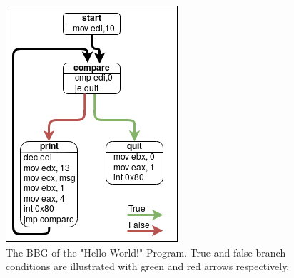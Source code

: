 \documentclass{kththesis}
\begin{document}
\begin{figure}[th]
    \centering
    \includegraphics[scale=0.6]{Images/BBGExample.png}
    \caption[The BBG of the "Hello World!" Program.]{The BBG of the "Hello World!" Program. True and false branch conditions are illustrated with green and red arrows respectively.}
    \label{fig:HelloBBG}
\end{figure}
\noindent
\end{document}
